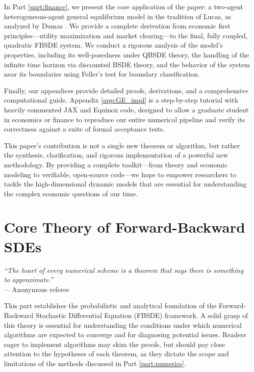 \documentclass[11pt,letterpaper,oneside]{article}
\theoremstyle{plain}
\theoremstyle{definition}
\theoremstyle{remark}
\begin{document}
In Part \ref{part:finance}, we present the core application of the paper: a two-agent heterogeneous-agent general equilibrium model in the tradition of Lucas, as analyzed by Dumas \cite{Dumas1989}. We provide a complete derivation from economic first principles—utility maximization and market clearing—to the final, fully coupled, quadratic FBSDE system. We conduct a rigorous analysis of the model's properties, including its well-posedness under QBSDE theory, the handling of the infinite time horizon via discounted BSDE theory, and the behavior of the system near its boundaries using Feller's test for boundary classification.

Finally, our appendices provide detailed proofs, derivations, and a comprehensive computational guide. Appendix \ref{app:GE_impl} is a step-by-step tutorial with heavily commented JAX and Equinox code, designed to allow a graduate student in economics or finance to reproduce our entire numerical pipeline and verify its correctness against a suite of formal acceptance tests.

This paper's contribution is not a single new theorem or algorithm, but rather the synthesis, clarification, and rigorous implementation of a powerful new methodology. By providing a complete toolkit—from theory and economic modeling to verifiable, open-source code—we hope to empower researchers to tackle the high-dimensional dynamic models that are essential for understanding the complex economic questions of our time.

\part{Core Theory of Forward-Backward SDEs}
\label{part:core_theory}

\begin{center}
\textit{``The heart of every numerical scheme is a theorem that says
there \emph{is} something to approximate.''}\\[4pt]
—\,Anonymous referee
\end{center}

This part establishes the probabilistic and analytical foundation of the Forward-Backward Stochastic Differential Equation (FBSDE) framework. A solid grasp of this theory is essential for understanding the conditions under which numerical algorithms are expected to converge and for diagnosing potential issues. Readers eager to implement algorithms may skim the proofs, but should pay close attention to the hypotheses of each theorem, as they dictate the scope and limitations of the methods discussed in Part \ref{part:numerics}.
 
\end{document}
